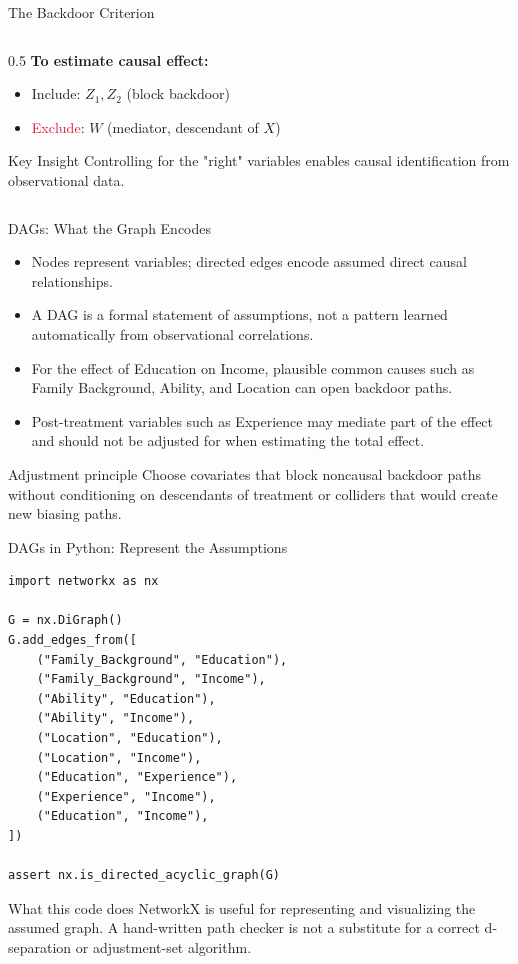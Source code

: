 \documentclass[aspectratio=169,11pt]{beamer}
\begin{document}
\begin{frame}{The Backdoor Criterion}
\begin{columns}
\begin{column}{0.5\textwidth}
\textbf{To estimate causal effect:}
\begin{itemize}
\item \textcolor{forest}{Include}: $Z_1, Z_2$ (block backdoor)
\item \textcolor{crimson}{Exclude}: $W$ (mediator, descendant of $X$)
\end{itemize}

\begin{alertblock}{Key Insight}
Controlling for the "right" variables enables causal identification from observational data.
\end{alertblock}
\end{column}
\end{columns}
\end{frame}

\begin{frame}{DAGs: What the Graph Encodes}
\begin{itemize}
  \item Nodes represent variables; directed edges encode assumed direct causal relationships.
  \item A DAG is a formal statement of assumptions, not a pattern learned automatically from observational correlations.
  \item For the effect of Education on Income, plausible common causes such as Family Background, Ability, and Location can open backdoor paths.
  \item Post-treatment variables such as Experience may mediate part of the effect and should not be adjusted for when estimating the total effect.
\end{itemize}

\begin{alertblock}{Adjustment principle}
Choose covariates that block noncausal backdoor paths without conditioning on descendants of treatment or colliders that would create new biasing paths.
\end{alertblock}
\end{frame}

\begin{frame}[fragile]{DAGs in Python: Represent the Assumptions}
\begin{lstlisting}[style=code,basicstyle=\ttfamily\small]
import networkx as nx

G = nx.DiGraph()
G.add_edges_from([
    ("Family_Background", "Education"),
    ("Family_Background", "Income"),
    ("Ability", "Education"),
    ("Ability", "Income"),
    ("Location", "Education"),
    ("Location", "Income"),
    ("Education", "Experience"),
    ("Experience", "Income"),
    ("Education", "Income"),
])

assert nx.is_directed_acyclic_graph(G)
\end{lstlisting}

\begin{block}{What this code does}
NetworkX is useful for representing and visualizing the assumed graph. A hand-written path checker is not a substitute for a correct d-separation or adjustment-set algorithm.
\end{block}
\end{frame}
\end{document}
